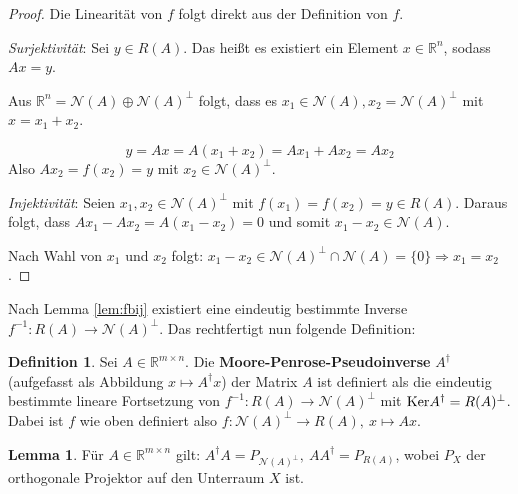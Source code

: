 \documentclass{article}
\newcommand{\R}[0]{\mathbb{R}}
\theoremstyle{plain}
\theoremstyle{definition}
\newtheorem{defin}[thm]{Definition}
\newtheorem{lemma}[thm]{Lemma}
\begin{document}
\begin{proof}
    Die Linearität von $f$ folgt direkt aus der Definition von $f$.

    \textit{Surjektivität}: Sei $y \in R(A)$. Das heißt es existiert ein Element $x \in \R^n$, sodass $Ax = y$. 
    
    Aus $\R^n = \mathcal{N}(A) \oplus \mathcal{N}(A)^{\bot}$ folgt, dass es $x_1 \in \mathcal{N}(A), x_2 = \mathcal{N}(A)^{\bot}$ mit $x = x_1 + x_2$.

    \begin{equation}
        y = Ax = A(x_1 + x_2) = Ax_1 + Ax_2 = Ax_2
    \end{equation}
    Also $Ax_2 = f(x_2) = y$ mit $x_2 \in \mathcal{N}(A)^{\bot}$.

    \textit{Injektivität}: Seien $x_1, x_2 \in \mathcal{N}(A)^{\bot}$ mit $f(x_1) = f(x_2) = y \in R(A)$. Daraus folgt, dass $Ax_1 - Ax_2 = A(x_1 - x_2) = 0$ und somit $x_1 - x_2 \in \mathcal{N}(A)$.
    
    Nach Wahl von $x_1$ und $x_2$ folgt: $x_1 - x_2 \in \mathcal{N}(A)^{\bot} \cap \mathcal{N}(A) = \{0\} \Rightarrow x_1 = x_2$.

\end{proof}

Nach Lemma \ref{lem:fbij} existiert eine eindeutig bestimmte Inverse $f^{-1}: R(A) \to \mathcal{N}(A)^{\bot}$. Das rechtfertigt nun folgende Definition:
\begin{defin}\label{defin:pinv}
    Sei $A \in \R^{m \times n}$. Die \textbf{Moore-Penrose-Pseudoinverse} $A^{\dagger}$ (aufgefasst als Abbildung $x \mapsto A^{\dagger}x$) der Matrix $A$ 
    ist definiert als die eindeutig bestimmte lineare Fortsetzung von $f^{-1}: R(A) \to \mathcal{N}(A)^{\bot}$ mit ${\rm Ker}A^{\dagger} = R(A)^{\bot}$.
    Dabei ist $f$ wie oben definiert also $f: \mathcal{N}(A)^{\bot} \to R(A),\: x \mapsto Ax$.
\end{defin}

\begin{lemma}\label{lem:pinvp}
    Für $A \in \R^{m \times n}$ gilt: $A^{\dagger}A = P_{\mathcal{N}(A)^{\bot}}, \: AA^{\dagger} = P_{R(A)}$, wobei $P_X$ der orthogonale Projektor auf den Unterraum $X$ ist.
\end{lemma}
\end{document}
